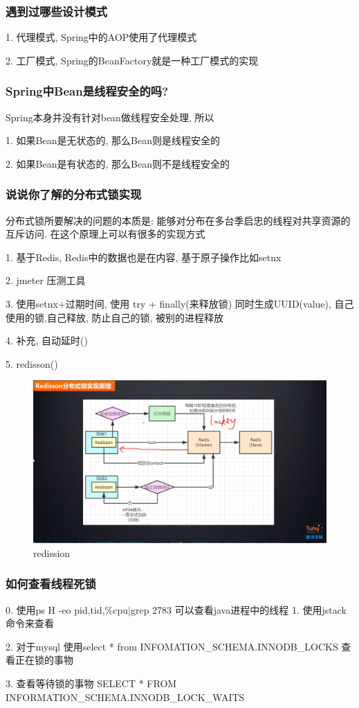 \documentclass[UTF8]{ctexart}
\begin{document}
\subsubsection{遇到过哪些设计模式}
1. 代理模式, Spring中的AOP使用了代理模式 \par
2. 工厂模式, Spring的BeanFactory就是一种工厂模式的实现 \par
\subsubsection{Spring中Bean是线程安全的吗?}
Spring本身并没有针对bean做线程安全处理, 所以 \par
1. 如果Bean是无状态的, 那么Bean则是线程安全的 \par
2. 如果Bean是有状态的, 那么Bean则不是线程安全的

\subsubsection{说说你了解的分布式锁实现}
分布式锁所要解决的问题的本质是: 能够对分布在多台季启忠的线程对共享资源的互斥访问. 在这个原理上可以有很多的实现方式 \par
1. 基于Redis, Redis中的数据也是在内容, 基于原子操作比如setnx \par
2. jmeter 压测工具 \par
3. 使用setnx+过期时间, 使用 try + finally(来释放锁) 同时生成UUID(value), 自己使用的锁,自己释放, 防止自己的锁, 被别的进程释放 \par
4. 补充, 自动延时() \par
5. redisson() \par
\begin{figure}
	\centering
	\includegraphics[width=0.7\linewidth]{figures/redission.png}
	\caption{redission}
	\label{fig:redission}
\end{figure}
\subsubsection{如何查看线程死锁}
0. 使用ps H -eo pid,tid,\%cpu|grep 2783 可以查看java进程中的线程
1. 使用jstack命令来查看 \par
2. 对于mysql 使用select * from INFOMATION\_SCHEMA.INNODB\_LOCKS 查看正在锁的事物 \par
3. 查看等待锁的事物 SELECT * FROM INFORMATION\_SCHEMA.INNODB\_LOCK\_WAITS \par
\end{document}
